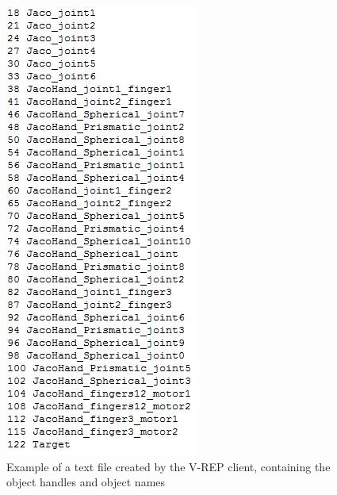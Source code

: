\documentclass[12pt,openany,a4paper]{book}
\begin{document}
\begin{center}
\begin{figure}[htb]
  \includegraphics[width=0.4\linewidth]{text_file_example.jpg}
\caption{Example of a text file created by the V-REP client, containing the object handles and object names}
\end{figure}
\end{center}

\vspace{\baselineskip}
\end{document}
